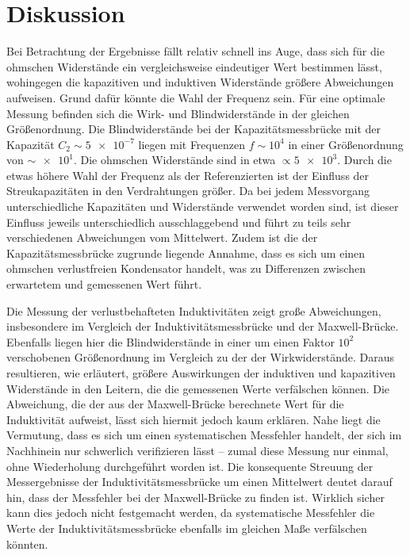 \section{Diskussion}
\label{sec:Diskussion}

Bei Betrachtung der Ergebnisse fällt relativ schnell ins Auge, dass sich für die 
ohmschen Widerstände ein vergleichsweise eindeutiger Wert bestimmen lässt, wohingegen die kapazitiven und induktiven 
Widerstände größere Abweichungen aufweisen. 
Grund dafür könnte die Wahl der Frequenz sein. 
Für eine optimale Messung befinden sich die Wirk- und Blindwiderstände in der gleichen Größenordnung. 
Die Blindwiderstände bei der Kapazitätsmessbrücke mit der Kapazität ${C_2\sim \num{5e-7}}$ liegen mit Frequenzen 
${f \sim 10^4}$ in einer Größenordnung von ${\sim \num{e1}}$. Die ohmschen Widerstände sind in etwa ${\propto \num{5e3}}$. 
Durch die etwas höhere Wahl der Frequenz als der Referenzierten ist der Einfluss der Streukapazitäten in den 
Verdrahtungen größer. Da bei jedem Messvorgang unterschiedliche Kapazitäten und Widerstände verwendet worden sind, ist 
dieser Einfluss jeweils unterschiedlich ausschlaggebend und führt zu teils sehr verschiedenen Abweichungen vom Mittelwert. 
Zudem ist die der Kapazitätsmessbrücke zugrunde liegende Annahme, dass es sich um einen ohmschen verlustfreien Kondensator 
handelt, was zu Differenzen zwischen erwartetem und gemessenen Wert führt. 

Die Messung der verlustbehafteten Induktivitäten zeigt große Abweichungen, insbesondere im Vergleich der Induktivitätsmessbrücke 
und der Maxwell-Brücke. 
Ebenfalls liegen hier die Blindwiderstände in einer um einen Faktor ${10^2}$ verschobenen Größenordnung im Vergleich zu 
der der Wirkwiderstände. Daraus resultieren, wie erläutert, größere Auswirkungen der induktiven und kapazitiven Widerstände 
in den Leitern, die die gemessenen Werte verfälschen können. 
Die Abweichung, die der aus der Maxwell-Brücke berechnete Wert für die Induktivität aufweist, lässt sich hiermit jedoch kaum
erklären. 
Nahe liegt die Vermutung, dass es sich um einen systematischen Messfehler handelt, der sich im Nachhinein nur schwerlich 
verifizieren lässt -- zumal diese Messung nur einmal, ohne Wiederholung durchgeführt worden ist. 
Die konsequente Streuung der Messergebnisse der Induktivitätsmessbrücke um einen Mittelwert deutet darauf hin, dass der Messfehler 
bei der Maxwell-Brücke zu finden ist. 
Wirklich sicher kann dies jedoch nicht festgemacht werden, da systematische Messfehler die Werte der Induktivitätsmessbrücke
ebenfalls im gleichen Maße verfälschen könnten. 

